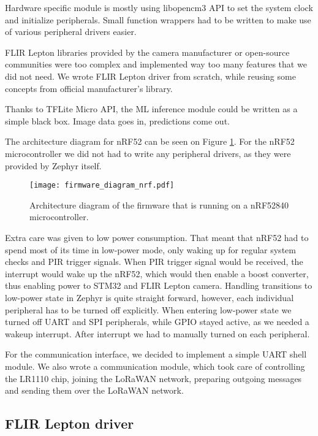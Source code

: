 Hardware specific module is mostly using libopencm3 API to set the system clock and initialize peripherals.
Small function wrappers had to be written to make use of various peripheral drivers easier.

FLIR Lepton libraries provided by the camera manufacturer or open-source communities were too complex and implemented way too many features that we did not need.
We wrote FLIR Lepton driver from scratch, while reusing some concepts from official manufacturer's library.

Thanks to TFLite Micro API, the ML inference module could be written as a simple black box.
Image data goes in, predictions come out.

The architecture diagram for nRF52 can be seen on Figure \ref{firmware_diagram_wisent}.
For the nRF52 microcontroller we did not had to write any peripheral drivers, as they were provided by Zephyr itself.
\newline
\begin{figure}[ht]
        \centering
        \texttt{[image: firmware\_diagram\_nrf.pdf]} 
        \caption{ Architecture diagram of the firmware that is running on a nRF52840 microcontroller.} 
        \label{firmware_diagram_wisent}
\end{figure}

Extra care was given to low power consumption.
That meant that nRF52 had to spend most of its time in low-power mode, only waking up for regular system checks and PIR trigger signals.
When PIR trigger signal would be received, the interrupt would wake up the nRF52, which would then enable a boost converter, thus enabling power to STM32 and FLIR Lepton camera.
Handling transitions to low-power state in Zephyr is quite straight forward, however, each individual peripheral has to be turned off explicitly.
When entering low-power state we turned off UART and SPI peripherals, while GPIO stayed active, as we needed a wakeup interrupt.
After interrupt we had to manually turned on each peripheral.

For the communication interface, we decided to implement a simple UART shell module.
We also wrote a communication module, which took care of controlling the LR1110 chip, joining the LoRaWAN network, preparing outgoing messages and sending them over the LoRaWAN network.
\clearpage

\subsection{ FLIR Lepton driver}


